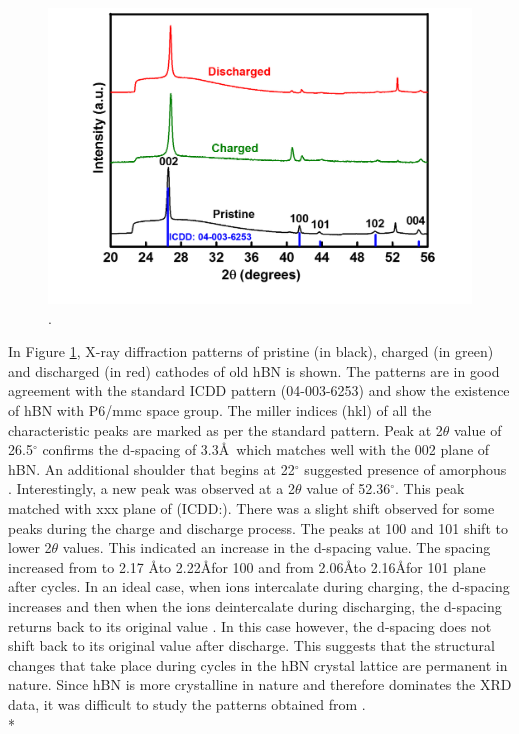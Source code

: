 \begin{figure}[tbh!]
\centering
\includegraphics[width=\textwidth]{Figures/BOhBN/hBNXRD2}
\caption{.}
\label{Figures/BOhBN:hBNXRD2}
\end{figure}

In Figure \ref{Figures/BOhBN:hBNXRD2}, X-ray diffraction patterns of pristine (in black), charged (in green) and discharged (in red) cathodes of old hBN is shown. The patterns are in good agreement with the standard ICDD pattern (04-003-6253) and show the existence of hBN with P6/mmc space group. The miller indices (hkl) of all the characteristic peaks are marked as per the standard pattern. Peak at 2$\theta$ value of 26.5$^{\circ}$ confirms the d-spacing of 3.3\AA\, which matches well with the 002 plane of hBN. An additional shoulder that begins at 22$^{\circ}$ suggested presence of amorphous . Interestingly, a new peak was observed at a 2$\theta$ value of 52.36$^{\circ}$. This peak matched with xxx plane of  (ICDD:). There was a slight shift observed for some peaks during the charge and discharge process. The peaks at 100 and 101 shift to lower 2$\theta$ values. This indicated an increase in the d-spacing value. The spacing increased from to 2.17 \AA to 2.22\AA for 100 and from 2.06\AA to 2.16\AA for 101 plane after cycles. In an ideal case, when ions intercalate during charging, the d-spacing increases and then when the ions deintercalate during discharging, the d-spacing returns back to its original value \cite{wang_advanced_2017}. In this case however, the d-spacing does not shift back to its original value after discharge. This suggests that the structural changes that take place during cycles in the hBN crystal lattice are permanent in nature. Since hBN is more crystalline in nature and therefore dominates the XRD data, it was difficult to study the patterns obtained from .  \\*

